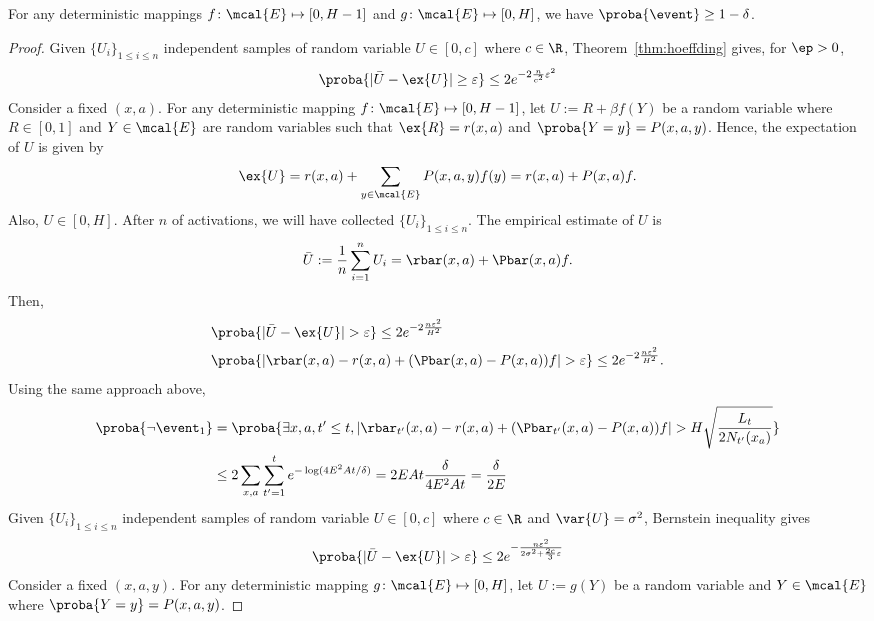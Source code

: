     \begin{lemma}
    \label{lem:high_prob}
    For any deterministic mappings $f\colon \mcal{E}\mapsto[0,H-1]$ and $g\colon \mcal{E}\mapsto[0,H]$, we have $\proba{\event}\ge1-\delta$.
    \end{lemma}
    \begin{proof}
    Given $\{U_i\}_{1\le i\le n}$ independent samples of random variable $U\in[0, c]$ where $c\in\R$, Theorem~\ref{thm:hoeffding} gives, for $\ep>0$,
    \begin{align*}
    \proba{|\bar{U}-\ex{U}|\ge \varepsilon} \le 2e^{-2\frac{n}{c^2}\varepsilon^2}
    \end{align*}
    Consider a fixed $(x,a)$.
    For any deterministic mapping $f\colon\mcal{E}\mapsto[0,H-1]$, let $U:=R+\beta f(Y)$ be a random variable where $R\in[0,1]$ and $Y\in\mcal{E}$ are random variables such that $\ex{R}=r(x,a)$ and $\proba{Y=y}=P(x,a,y)$.
    Hence, the expectation of $U$ is given by 
    \begin{align*}
    \ex{U}=r(x,a) +\sum_{y\in\mcal{E}}P(x,a,y)f(y)=r(x,a) +P(x,a)f.
    \end{align*}
    Also, $U\in [0,H]$.
    After $n$ of activations, we will have collected $\{U_i\}_{1\le i\le n}$.
    The empirical estimate of $U$ is
    $$\bar{U}:=\frac1n\sum_{i=1}^{n} U_i=\rbar(x,a) +\Pbar(x,a)f.$$
    Then,
    \begin{align*}
    &\proba{\vert\bar{U}-\ex{U}\vert >\varepsilon} \le2e^{-2\frac{n\varepsilon^2}{H^2}} \\
    &\proba{\vert \rbar(x,a)-r(x,a) +(\Pbar(x,a) -P(x,a))f\vert >\varepsilon} \le2e^{-2\frac{n\varepsilon^2}{H^2}}.
    \end{align*}
    Using the same approach above,
    \begin{align*}
    \proba{\neg\event_1} 
    &=\proba{\exists x,a, t'\le t,|\rbar_{t'}(x,a)-r(x,a)+(\Pbar_{t'}(x,a)-P(x,a))f| >H\sqrt{\frac{L_t}{2N_{t'}(x_a)}}} \\
    &\le2\sum_{x,a} \sum_{t'=1}^{t}e^{-\log(4E^2At/\delta)} =2EAt\frac{\delta}{4E^2At}=\frac{\delta}{2E}
    \end{align*}
    Given $\{U_i\}_{1\le i\le n}$ independent samples of random variable $U\in[0, c]$ where $c\in\R$ and $\var{U}=\sigma^2$, Bernstein inequality gives
    \begin{align*}
    \proba{|\bar{U}-\ex{U}|> \varepsilon} \le 2e^{-\frac{n\varepsilon^2}{2\sigma^2+\frac{2c}3\varepsilon}}
    \end{align*}
    Consider a fixed $(x,a,y)$. For any deterministic mapping $g\colon\mcal{E}\mapsto[0,H]$, let $U:=g(Y)$ be a random variable and $Y\in\mcal{E}$ where $\proba{Y=y}=P(x,a,y)$.

\end{proof}
